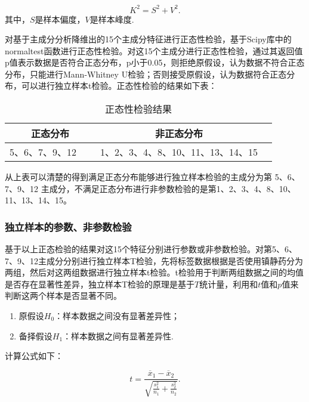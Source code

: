 \begin{equation}
    {{K}^{2}}={{S}^{2}}+{{V}^{2}}.
\end{equation}
其中，$S$是样本偏度，$V$是样本峰度.

对基于主成分分析降维出的15个主成分特征进行正态性检验，基于Scipy库中的normaltest函数进行正态性检验。对这15个主成分进行正态性检验，通过其返回值p值表示数据是否符合正态分布，p小于0.05，则拒绝原假设，认为数据不符合正态分布，只能进行Mann-Whitney U检验；否则接受原假设，认为数据符合正态分布，可以进行独立样本t检验。正态性检验的结果如下表：

\begin{table}[H]
    \centering  
    \caption{正态性检验结果}
    \begin{tabular}{c c c}  
    	\toprule[1.5pt]  
    	正态分布 & 非正态分布 \\  
    	\midrule[1pt]    
    	5、6、7、9、12~~~ & 1、2、3、4、8、10、11、13、14、15 \\ 
    	\toprule[1.5pt]  
    \end{tabular}  
\end{table} 

从上表可以清楚的得到满足正态分布能够进行独立样本检验的主成分为第 5、6、7、9、12 主成分，不满足正态分布进行非参数检验的是第1、2、3、4、8、10、11、13、14、15。

\subsubsection{独立样本的参数、非参数检验}

基于以上正态检验的结果对这15个特征分别进行参数或非参数检验。对第5、6、7、9、12主成分分别进行独立样本T检验，先将标签数据根据是否使用镇静药分为两组，然后对这两组数据进行独立样本t检验。t检验用于判断两组数据之间的均值是否存在显著性差异，独立样本T检验的原理是基于$T$统计量，利用和$t$值和$p$值来判断这两个样本是否显著不同。

\begin{enumerate}
  \item 原假设${{H}_{0}}$：样本数据之间没有显著差异性；
  \item 备择假设${{H}_{1}}$：样本数据之间有显著差异性.
\end{enumerate}
计算公式如下：

\begin{equation}
    t=\frac{{{\overline{x}}_{1}}-{{\overline{x}}_{2}}}{\sqrt{\frac{s_{1}^{2}}{{{n}_{1}}}+\frac{s_{2}^{2}}{{{n}_{2}}}}}.
\end{equation}


